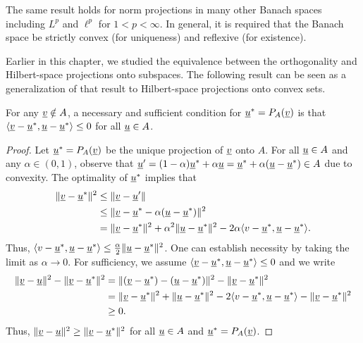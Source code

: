 \begin{remark}
The same result holds for norm projections in many other Banach spaces including $L^{p}$ and $\ell^{p}$ for $1<p<\infty$. In general, it is required that the Banach space be strictly convex (for uniqueness) and reflexive (for existence).
\end{remark}

Earlier in this chapter, we studied the equivalence between the orthogonality and Hilbert-space projections onto subspaces.
The following result can be seen as a generalization of that result to Hilbert-space projections onto convex sets.

\begin{lemma}
\label{lemma:convex_proj_lt0}
For any $\underline{v} \notin A$, a necessary and sufficient condition for $\underline{u}^* = P_A (\underline{v})$ is that $\langle \underline{v}-\underline{u}^*,\underline{u}-\underline{u}^* \rangle \leq 0$ for all $\underline{u}\in A$.
\end{lemma}
\begin{proof}
Let $\underline{u}^* = P_A (\underline{v})$ be the unique projection of $\underline{v}$ onto $A$.
For all $\underline{u} \in A$ %
and any $\alpha\in (0,1)$, observe that $\underline{u}'=(1-\alpha) \underline{u}^* + \alpha \underline{u} = \underline{u}^* + \alpha (\underline{u}-\underline{u}^*)\in A$ due to convexity.
The optimality of $\underline{u}^*$ implies that
\begin{align*}
\| \underline{v}-\underline{u}^* \|^2
&\leq \| \underline{v}- \underline{u}' \| \\
&\leq \| \underline{v}- \underline{u}^* - \alpha (\underline{u}-\underline{u}^*) \|^2 \\
&= \| \underline{v} - \underline{u}^* \|^2 + \alpha^2 \| \underline{u} - \underline{u}^* \|^2 - 2 \alpha \langle v-\underline{u}^*,\underline{u}-\underline{u}^* \rangle. 
\end{align*}
Thus, $\langle v-\underline{u}^*,\underline{u}-\underline{u}^* \rangle \leq \frac{\alpha}{2} \| \underline{u} - \underline{u}^* \|^2$.
One can establish necessity by taking the limit as $\alpha \to 0$.
For sufficiency, we assume $\langle \underline{v}-\underline{u}^*,\underline{u}-\underline{u}^* \rangle \leq 0$ and we write
\begin{align*}
\| \underline{v}-\underline{u} \|^2 - \| \underline{v} - \underline{u}^* \|^2
&= \| (\underline{v} - \underline{u}^*) - (\underline{u} - \underline{u}^*) \|^2 - \|\underline{v} - \underline{u}^* \|^2 \\
&= \| \underline{v}-\underline{u}^* \|^2 + \| \underline{u} -\underline{u}^* \| ^2 - 2 \langle v-\underline{u}^*,\underline{u}-\underline{u}^* \rangle - \|\underline{v}-\underline{u}^* \|^2 \\
&\geq 0.
\end{align*}
Thus, $\| \underline{v}-\underline{u} \|^2 \geq \| \underline{v} - \underline{u}^* \|^2$ for all $\underline{u} \in A$ and $\underline{u}^* = P_A (\underline{v})$.
\end{proof}

